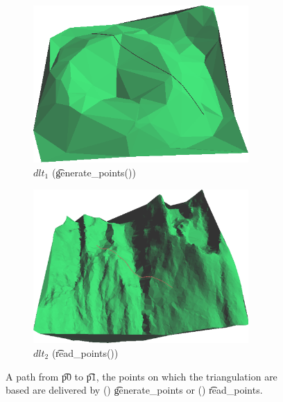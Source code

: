 	\begin{figure}
		\centering
		\begin{subfigure}[b]{0.45\textwidth}
			\centering
			\includegraphics[width=0.9\textwidth]{./img/d_result1}
			\caption{$dlt_1$ (\t{generate_points()})}
			\label{subfig:d:result1}
		\end{subfigure}
		\begin{subfigure}[b]{0.45\textwidth}
			\centering
			\includegraphics[width=0.9\textwidth]{./img/d_result2}
			\caption{$dlt_2$ (\t{read_points()})}
			\label{subfig:d:result2}
		\end{subfigure}	
		\caption{A path from \t{p0} to \t{p1}, the points on which the triangulation are based are delivered by () \t{generate_points} or () \t{read_points}.}
		\label{fig:d:results}
	\end{figure}

